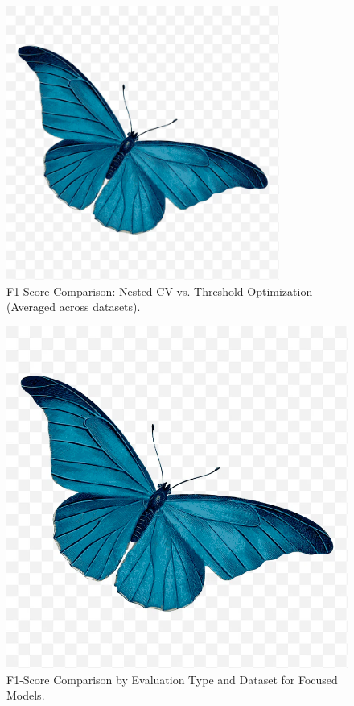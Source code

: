 \documentclass{article}
\begin{document}
\begin{figure}[htbp] %
    \centering
    \includegraphics[width=0.8\textwidth]{f1-type-model-comparison.png}
    \caption{F1-Score Comparison: Nested CV vs. Threshold Optimization (Averaged across datasets).}
    \label{fig:f1_comparison_type_model}
\end{figure}

\begin{figure}[htbp] %
    \centering
    \includegraphics[width=\textwidth]{f1-type-dataset-catplot.png}
    \caption{F1-Score Comparison by Evaluation Type and Dataset for Focused Models.}
    \label{fig:f1_comparison_type_dataset}
\end{figure}
\end{document}
